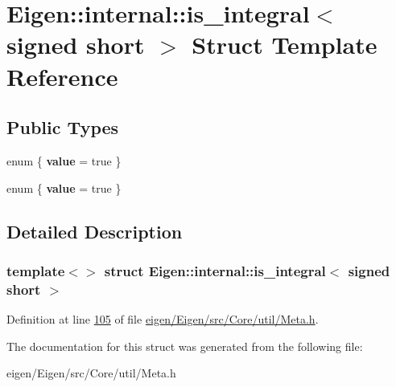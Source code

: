 \hypertarget{struct_eigen_1_1internal_1_1is__integral_3_01signed_01short_01_4}{}\section{Eigen\+:\+:internal\+:\+:is\+\_\+integral$<$ signed short $>$ Struct Template Reference}
\label{struct_eigen_1_1internal_1_1is__integral_3_01signed_01short_01_4}
\subsection*{Public Types}
\begin{DoxyCompactItemize}
\item 
\mbox{\label{struct_eigen_1_1internal_1_1is__integral_3_01signed_01short_01_4_a4b05c7577002c3199a4b0317b54b83ec}} 
enum \{ {\bfseries value} = true
 \}
\item 
\mbox{\label{struct_eigen_1_1internal_1_1is__integral_3_01signed_01short_01_4_a662c6ceb0741327649259bf647f8cde4}} 
enum \{ {\bfseries value} = true
 \}
\end{DoxyCompactItemize}


\subsection{Detailed Description}
\subsubsection*{template$<$$>$\newline
struct Eigen\+::internal\+::is\+\_\+integral$<$ signed short $>$}



Definition at line \hyperlink{eigen_2_eigen_2src_2_core_2util_2_meta_8h_source_l00105}{105} of file \hyperlink{eigen_2_eigen_2src_2_core_2util_2_meta_8h_source}{eigen/\+Eigen/src/\+Core/util/\+Meta.\+h}.



The documentation for this struct was generated from the following file\+:\begin{DoxyCompactItemize}
\item 
eigen/\+Eigen/src/\+Core/util/\+Meta.\+h\end{DoxyCompactItemize}
